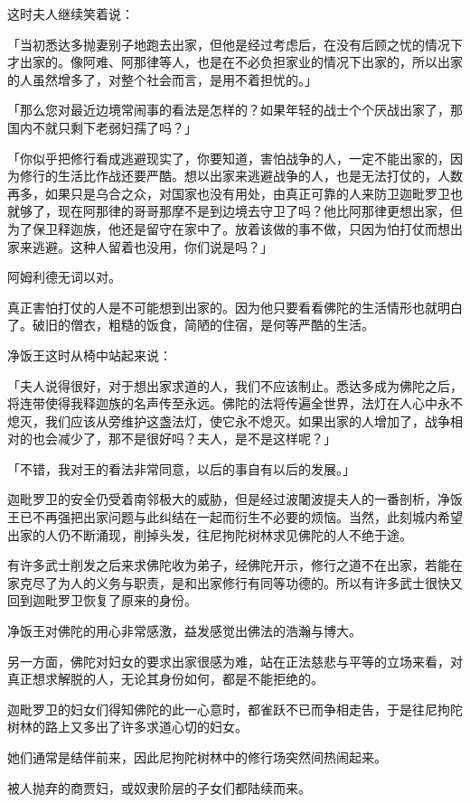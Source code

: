 \documentclass[twoside,openany]{book}
\begin{document}
这时夫人继续笑着说：

「当初悉达多抛妻别子地跑去出家，但他是经过考虑后，在没有后顾之忧的情况下才出家的。像阿难、阿那律等人，也是在不必负担家业的情况下出家的，所以出家的人虽然增多了，对整个社会而言，是用不着担忧的。」

「那么您对最近边境常闹事的看法是怎样的？如果年轻的战士个个厌战出家了，那国内不就只剩下老弱妇孺了吗？」

「你似乎把修行看成逃避现实了，你要知道，害怕战争的人，一定不能出家的，因为修行的生活比作战还要严酷。想以出家来逃避战争的人，也是无法打仗的，人数再多，如果只是乌合之众，对国家也没有用处，由真正可靠的人来防卫迦毗罗卫也就够了，现在阿那律的哥哥那摩不是到边境去守卫了吗？他比阿那律更想出家，但为了保卫释迦族，他还是留守在家中了。放着该做的事不做，只因为怕打仗而想出家来逃避。这种人留着也没用，你们说是吗？」

阿姆利德无词以对。

真正害怕打仗的人是不可能想到出家的。因为他只要看看佛陀的生活情形也就明白了。破旧的僧衣，粗糙的饭食，简陋的住宿，是何等严酷的生活。

净饭王这时从椅中站起来说：

「夫人说得很好，对于想出家求道的人，我们不应该制止。悉达多成为佛陀之后，将连带使得我释迦族的名声传至永远。佛陀的法将传遍全世界，法灯在人心中永不熄灭，我们应该从旁维护这盏法灯，使它永不熄灭。如果出家的人增加了，战争相对的也会减少了，那不是很好吗？夫人，是不是这样呢？」

「不错，我对王的看法非常同意，以后的事自有以后的发展。」

迦毗罗卫的安全仍受着南邻极大的威胁，但是经过波闍波提夫人的一番剖析，净饭王已不再强把出家问题与此纠结在一起而衍生不必要的烦恼。当然，此刻城内希望出家的人仍不断涌现，削掉头发，往尼拘陀树林求见佛陀的人不绝于途。

有许多武士削发之后来求佛陀收为弟子，经佛陀开示，修行之道不在出家，若能在家克尽了为人的义务与职责，是和出家修行有同等功德的。所以有许多武士很快又回到迦毗罗卫恢复了原来的身份。

净饭王对佛陀的用心非常感激，益发感觉出佛法的浩瀚与博大。

另一方面，佛陀对妇女的要求出家很感为难，站在正法慈悲与平等的立场来看，对真正想求解脱的人，无论其身份如何，都是不能拒绝的。

迦毗罗卫的妇女们得知佛陀的此一心意时，都雀跃不已而争相走告，于是往尼拘陀树林的路上又多出了许多求道心切的妇女。

她们通常是结伴前来，因此尼拘陀树林中的修行场突然间热闹起来。

被人抛弃的商贾妇，或奴隶阶层的子女们都陆续而来。
\end{document}
